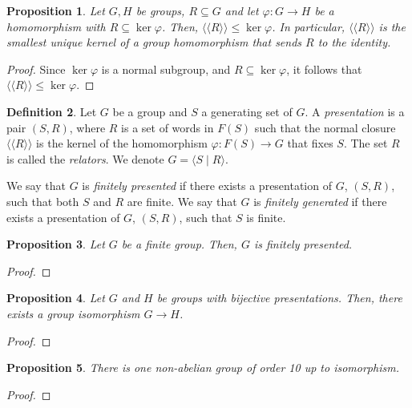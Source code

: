 \documentclass[a4paper, openany]{memoir}
\theoremstyle{definition}
\newtheorem{definition}{Definition}[section]
\theoremstyle{plain}
\newtheorem{proposition}[definition]{Proposition}
\begin{document}
    \begin{proposition}
        Let $G, H$ be groups, $R \subseteq G$ and let $\varphi \colon G \to H$ be a homomorphism with $R \subseteq \ker \varphi$. Then, $\langle \langle R \rangle \rangle \leq \ker \varphi$. In particular, $\langle \langle R \rangle \rangle$ is the smallest unique kernel of a group homomorphism that sends $R$ to the identity.
    \end{proposition}
    \begin{proof}
        Since $\ker \varphi$ is a normal subgroup, and $R \subseteq \ker \varphi$, it follows that $\langle \langle R \rangle \rangle \leq \ker \varphi$.
    \end{proof}

    \begin{definition}
        Let $G$ be a group and $S$ a generating set of $G$. A \emph{presentation} is a pair $(S, R)$, where $R$ is a set of words in $F(S)$ such that the normal closure $\langle \langle R \rangle \rangle$ is the kernel of the homomorphism $\varphi \colon F(S) \to G$ that fixes $S$. The set $R$ is called the \emph{relators}. We denote $G = \langle S \mid R \rangle$. 
        
        We say that $G$ is \emph{finitely presented} if there exists a presentation of $G$, $(S, R)$, such that both $S$ and $R$ are finite. We say that $G$ is \emph{finitely generated} if there exists a presentation of $G$, $(S, R)$, such that $S$ is finite.
    \end{definition}

    \begin{proposition}
        Let $G$ be a finite group. Then, $G$ is finitely presented.
    \end{proposition}
    \begin{proof}
        
    \end{proof}

    \begin{proposition}
        Let $G$ and $H$ be groups with bijective presentations. Then, there exists a group isomorphism $G \to H$.
    \end{proposition}
    \begin{proof}
        
    \end{proof}

    \begin{proposition}
        There is one non-abelian group of order 10 up to isomorphism.
    \end{proposition}
    \begin{proof}
        
    \end{proof}
\end{document}
